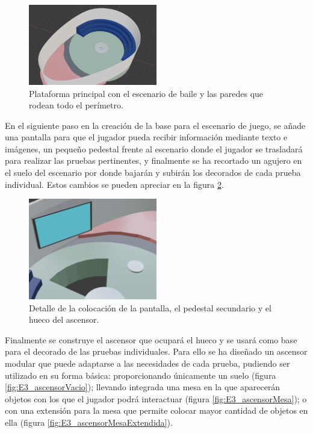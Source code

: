 \begin{figure}
  \centering
    \includegraphics[width=0.5\textwidth]{04.Desarrollo/03.Entrega3/02.Iteracion3_2/00.Figuras/02.escenario_6.png}
    \caption{Plataforma principal con el escenario de baile y las paredes que rodean todo el perímetro.}
    \label{fig:E3_escenario2}
\end{figure}

En el siguiente paso en la creación de la base para el escenario de juego, se añade una pantalla para que el jugador pueda recibir información mediante texto e imágenes, un pequeño pedestal frente al escenario donde el jugador se trasladará para realizar las pruebas pertinentes, y finalmente se ha recortado un agujero en el suelo del escenario por donde bajarán y subirán los decorados de cada prueba individual. Estos cambios se pueden apreciar en la figura \ref{fig:E3_escenario3}.

\begin{figure}
  \centering
    \includegraphics[width=0.5\textwidth]{04.Desarrollo/03.Entrega3/02.Iteracion3_2/00.Figuras/03.escenario_7.png}
    \caption{Detalle de la colocación de la pantalla, el pedestal secundario y el hueco del ascensor.}
    \label{fig:E3_escenario3}
\end{figure}


Finalmente se construye el ascensor que ocupará el hueco y se usará como base para el decorado de las pruebas individuales. Para ello se ha diseñado un ascensor modular que puede adaptarse a las necesidades de cada prueba, pudiendo ser utilizado en su forma básica: proporcionando únicamente un suelo (figura \ref{fig:E3_ascensorVacio}); llevando integrada una mesa en la que aparecerán objetos con los que el jugador podrá interactuar (figura \ref{fig:E3_ascensorMesa}); o con una extensión para la mesa que permite colocar mayor cantidad de objetos en ella (figura \ref{fig:E3_ascensorMesaExtendida}).


